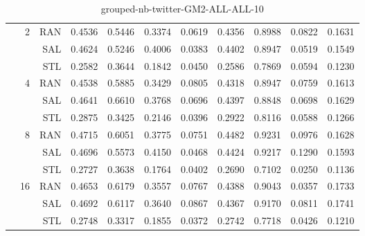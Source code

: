 \begin{center}
\begin{table}[htbp]
\begin{center}
\begin{tabular}{ | r | r | r | r | r | r | r | r | r | r | r |}
 & \multirow{3}{*}{2} & RAN & 0.4536 & 0.5446 & 0.3374 & 0.0619 & 0.4356 & 0.8988 & 0.0822 & 0.1631\\ \cline{3-11}
 &   & SAL & 0.4624 & 0.5246 & 0.4006 & 0.0383 & 0.4402 & 0.8947 & 0.0519 & 0.1549\\ \cline{3-11}
 &   & STL & 0.2582 & 0.3644 & 0.1842 & 0.0450 & 0.2586 & 0.7869 & 0.0594 & 0.1230\\ \cline{2-11}
 & \multirow{3}{*}{4} & RAN & 0.4538 & 0.5885 & 0.3429 & 0.0805 & 0.4318 & 0.8947 & 0.0759 & 0.1613\\ \cline{3-11}
 &   & SAL & 0.4641 & 0.6610 & 0.3768 & 0.0696 & 0.4397 & 0.8848 & 0.0698 & 0.1629\\ \cline{3-11}
 &   & STL & 0.2875 & 0.3425 & 0.2146 & 0.0396 & 0.2922 & 0.8116 & 0.0588 & 0.1266\\ \cline{2-11}
 & \multirow{3}{*}{8} & RAN & 0.4715 & 0.6051 & 0.3775 & 0.0751 & 0.4482 & 0.9231 & 0.0976 & 0.1628\\ \cline{3-11}
 &   & SAL & 0.4696 & 0.5573 & 0.4150 & 0.0468 & 0.4424 & 0.9217 & 0.1290 & 0.1593\\ \cline{3-11}
 &   & STL & 0.2727 & 0.3638 & 0.1764 & 0.0402 & 0.2690 & 0.7102 & 0.0250 & 0.1136\\ \cline{2-11}
 & \multirow{3}{*}{16} & RAN & 0.4653 & 0.6179 & 0.3557 & 0.0767 & 0.4388 & 0.9043 & 0.0357 & 0.1733\\ \cline{3-11}
 &   & SAL & 0.4692 & 0.6117 & 0.3640 & 0.0867 & 0.4367 & 0.9170 & 0.0811 & 0.1741\\ \cline{3-11}
 &   & STL & 0.2748 & 0.3317 & 0.1855 & 0.0372 & 0.2742 & 0.7718 & 0.0426 & 0.1210\\ \cline{2-11}
\hline
\end{tabular}
\caption{grouped-nb-twitter-GM2-ALL-ALL-10}
\end{center}
 \end{table}
\end{center}

